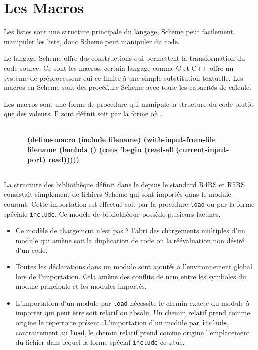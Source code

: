 \section{Les Macros}
\label{sec:ch2_macro}

Les listes sont une structure principale du langage,
Scheme peut facilement manipuler les liste, donc Scheme peut manipuler du code.


Le langage Scheme offre des constructions qui permettent la transformation
du code source. Ce sont les macros, certain langage comme C et C++ offre un système
de préprocesseur qui ce limite à une simple substitution textuelle. Les macros en Scheme
sont des procédure Scheme avec toute les capacités de calcule.

Les macros sont une forme de procédure qui manipule la structure du code
plutôt que des valeurs. Il sont définit soit par la forme 
où .
\begin{figure}[ht]
  \begin{tabular}{|l|}\hline
\begin{mplisting}{0.65}
(define-macro (include filename)
  (with-input-from-file
    filename
    (lambda ()
      (cons 'begin
        (read-all (current-input-port) read)))))
\end{mplisting}\\\hline
\end{tabular}
\end{figure}

La structure des bibliothèque définit dans le depuis le standard
R4RS\cite{Scheme:R4RS} et R5RS\cite{Scheme:R5RS} consistait simplement de
fichiers Scheme qui sont importés dans le module courant. Cette importation est
effectué soit par la procédure \texttt{load} ou par la forme spéciale
\texttt{include}. Ce modèle de bibliothèque possède plusieurs lacunes.

\begin{itemize}
  \item Ce modèle de chargement n'est pas à l'abri des chargements multiples
    d'un module qui amène soit la duplication de code ou la réévaluation
    non désiré d'un code.

  \item Toutes les déclarations dans un module sont ajoutés à l'environnement
    global lors de l'importation. Cela amène des conflits de nom entre les
    symboles du module principale et les modules importés.

  \item L'importation d'un module par \texttt{load} nécessite le chemin exacte
    du module à importer qui peut être soit relatif ou absolu.  Un chemin
    relatif prend comme origine le répertoire présent.  L'importation d'un
    module par \texttt{include}, contrairement au \texttt{load}, le chemin
    relatif prend comme origine l'emplacement du fichier dans lequel la forme
    spécial \texttt{include} ce situe.

\end{itemize}


